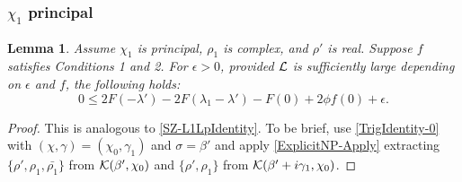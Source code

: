\documentclass[12pt,psamsfonts]{amsart}
\newtheorem{lem}[thm]{Lemma}
\theoremstyle{definition}
\theoremstyle{remark}
\numberwithin{equation}{section}
\begin{document}
\begin{table}
\caption{Bounds for $\lambda'$ with $\chi_1$ or $\rho_1$ complex and $\chi_1$ non-principal}
\label{Table-Lp-CC_Chi1NonPrincipal}
\end{table}


\subsubsection{$\chi_1$ principal}
\begin{lem} \label{CC-L1LpIdentity-0-real} 
Assume $\chi_1$ is principal, $\rho_1$ is complex, and $\rho'$ is real. 
Suppose $f$ satisfies Conditions 1 and 2. For $\epsilon > 0$, provided $\mathcal{L}$ is sufficiently large depending on $\epsilon$ and $f$,  the following holds: 
\[
0 \leq 2F(-\lambda') -  2F(\lambda_1-\lambda')  - F(0) + 2\phi f(0)+\epsilon.
\]
\end{lem}
\begin{proof} This is analogous to \cref{SZ-L1LpIdentity}. To be brief, use \eqref{TrigIdentity-0} with $(\chi,\gamma) = (\chi_0, \gamma_1)$ and $\sigma = \beta'$ and apply \cref{ExplicitNP-Apply} extracting $\{\rho', \rho_1, \bar{\rho_1}\}$ from $\mathcal{K}(\beta',\chi_0)$ and $\{\rho', \rho_1\}$ from $\mathcal{K}(\beta'+i\gamma_1,\chi_0)$.
\end{proof}
\end{document}
